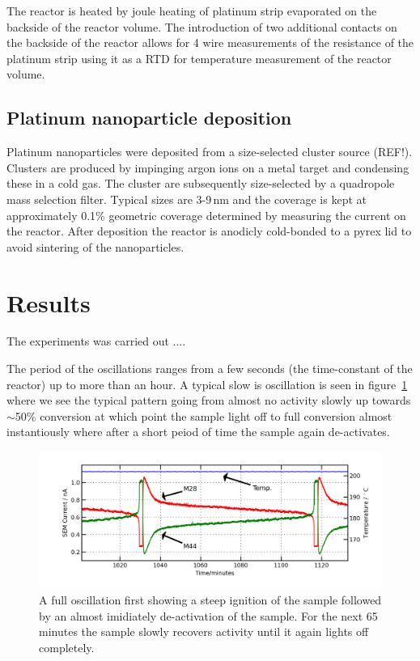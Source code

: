 \documentclass[8.5pt,twoside,twocolumn]{article}
\begin{document}
The reactor is heated by joule heating of platinum strip evaporated on the backside of the reactor volume. The introduction of two additional contacts on the backside of the reactor allows for 4 wire measurements of the resistance of the platinum strip using it as a RTD for temperature measurement of the reactor volume. 

\subsection{Platinum nanoparticle deposition}
Platinum nanoparticles were deposited from a size-selected cluster source (REF!). Clusters are produced by impinging argon ions on a metal target and condensing these in a cold gas. The cluster are subsequently size-selected by a quadropole mass selection filter. Typical sizes are 3-9\,nm and the coverage is kept at approximately 0.1\% geometric coverage determined by measuring the current on the reactor. After deposition the reactor is anodicly cold-bonded \cite{Vesborg2010} to a pyrex lid to avoid sintering of the nanoparticles.

\section{Results}
The experiments was carried out ....

The period of the oscillations ranges from a few seconds (the time-constant of the reactor) up to more than an hour. A typical slow is oscillation is seen in figure~\ref{fgr:full_oscillation} where we see the typical pattern going from almost no activity slowly up towards $\sim$50\% conversion at which point the sample light off to full conversion almost instantiously where after a short peiod of time the sample again de-activates.
\begin{figure}
  \centering
  \includegraphics[width=17cm]{single_full_oscillation.png}
  \caption{A full oscillation first showing a steep ignition of the sample followed by an almost imidiately de-activation of the sample. For the next 65 minutes the sample slowly recovers activity until it again lights off completely.}
  \label{fgr:full_oscillation}
\end{figure}
\end{document}
